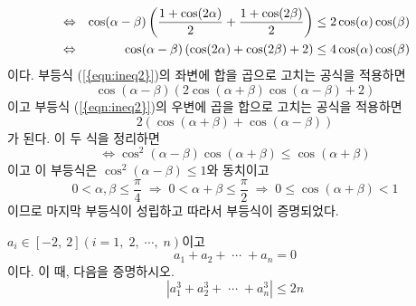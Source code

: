 \documentclass[11pt, a4paper]{book}
\begin{document}
\begin{problem}
{\begin{psolution}
\begin{align}
	&\Leftrightarrow & \cos(\alpha-\beta) \left(\frac{1+\cos(2\alpha)}{2} +\frac{1+\cos(2\beta)}{2}\right) &\leq 2\cos(\alpha)\cos(\beta) \nonumber\\
	&\Leftrightarrow & \cos(\alpha-\beta) \left(\cos(2\alpha)+\cos(2\beta)+2\right) &\leq 4\cos(\alpha)\cos(\beta) \label{{eqn:ineq2}}
	\end{align}
이다. 부등식 (\ref{{eqn:ineq2}})의 좌변에 합을 곱으로 고치는 공식을 적용하면
\begin{equation*}
	\cos(\alpha-\beta) \left(2\cos(\alpha+\beta) \cos(\alpha-\beta)+2\right)
\end{equation*}
이고 부등식 (\ref{{eqn:ineq2}})의 우변에 곱을 합으로 고치는 공식을 적용하면
\begin{equation*}
	2\left(\cos(\alpha+\beta)+\cos(\alpha-\beta)\right)
\end{equation*}
가 된다. 이 두 식을 정리하면
\begin{equation*}
\Leftrightarrow	\cos^{2}(\alpha-\beta)\cos(\alpha+\beta) \leq \cos(\alpha+\beta)
\end{equation*}
이고 이 부등식은 $\cos^{2}(\alpha-\beta)\leq 1$와 동치이고 
\begin{equation*}
	0< \alpha, \beta \leq \frac{\pi}{4} \;\Rightarrow \; 0<\alpha +\beta \leq \frac{\pi}{2} \; \Rightarrow \; 0 \leq \cos(\alpha+\beta)<1
\end{equation*}
이므로 마지막 부등식이 성립하고 따라서 부등식이 증명되었다.
\end{psolution}
}
\end{problem}
\vspace{1em}
\begin{problem}
	$a_{i} \in \left[-2, \:2\right]$$(i=1,\;2,\; \cdots, \; n)$이고 
	\begin{equation*}
		a_{1}+a_{2} + \; \cdots \; +a_{n} =0
	\end{equation*}
이다. 이 때, 다음을 증명하시오.
\begin{equation*}
	\left|a_{1}^{3} + a_{2}^{3} + \; \cdots \; + a_{n}^{3}\right| \leq 2n
\end{equation*}
\end{problem}
\end{document}
